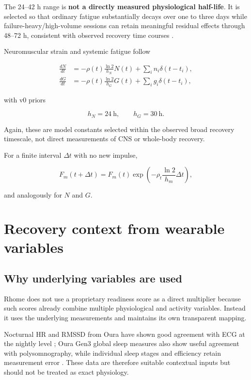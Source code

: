 \documentclass[11pt]{article}
\begin{document}
The 24--42 h range is \textbf{not a directly measured physiological half-life}. It is selected so that ordinary fatigue substantially decays over one to three days while failure-heavy/high-volume sessions can retain meaningful residual effects through 48--72 h, consistent with observed recovery time courses \cite{moran2017,thomas2018}.

Neuromuscular strain and systemic fatigue follow

\begin{align}
\frac{dN}{dt}&=-\rho(t)\frac{\ln2}{h_N}N(t)+\sum_i n_i\delta(t-t_i),\\
\frac{dG}{dt}&=-\rho(t)\frac{\ln2}{h_G}G(t)+\sum_i g_i\delta(t-t_i),
\end{align}

with v0 priors

\begin{equation}
h_N=24\ \mathrm{h},\qquad h_G=30\ \mathrm{h}.
\end{equation}

Again, these are model constants selected within the observed broad recovery timescale, not direct measurements of CNS or whole-body recovery.

For a finite interval $\Delta t$ with no new impulse,

\begin{equation}
F_m(t+\Delta t)=F_m(t)\exp\left(-\rho_t\frac{\ln2}{h_m}\Delta t\right),
\end{equation}

and analogously for $N$ and $G$.

\section{Recovery context from wearable variables}

\subsection{Why underlying variables are used}

Rhome does not use a proprietary readiness score as a direct multiplier because such scores already combine multiple physiological and activity variables. Instead it uses the underlying measurements and maintains its own transparent mapping.

Nocturnal HR and RMSSD from Oura have shown good agreement with ECG at the nightly level \cite{cao2022}; Oura Gen3 global sleep measures also show useful agreement with polysomnography, while individual sleep stages and efficiency retain measurement error \cite{svensson2024}. These data are therefore suitable contextual inputs but should not be treated as exact physiology.
\end{document}
